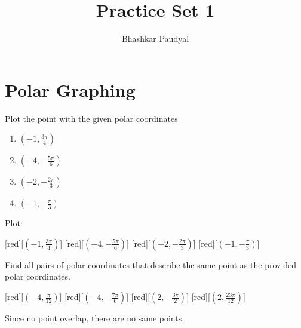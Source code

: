 \documentclass[a4paper, margin=0.5in]{article}
\author{Bhashkar Paudyal}
\title{Practice Set 1}
\begin{document}
\maketitle
\newpage

\tableofcontents{}
\newpage

\section{Polar Graphing}
\label{sec:polar-graphing}

\begin{problem}
  Plot the point with the given polar coordinates

  \begin{enumerate}
    \item \((-1,\frac{3\pi}{4})\) 
    \item \((-4, -\frac{5\pi}{6})\) 
    \item \((-2, -\frac{2\pi}{3})\) 
    \item \((-1, -\frac{\pi}{3})\) 
  \end{enumerate}

  \begin{solution}
    Plot:\\
    \begin{polargrid}[5][5][12][5.5]
      [red][\((-1,\frac{3\pi}{4})\)]
      [red][\((-4,-\frac{5\pi}{6})\)]
      [red][\((-2,-\frac{2\pi}{3})\)]
      [red][\((-1,-\frac{\pi}{3})\)]
    \end{polargrid}
  \end{solution}
\end{problem}

\newpage

\begin{problem}
  Find all pairs of polar coordinates that describe the same point as the
  provided polar coordinates.\\
  \begin{polargrid}[4][4][24][4.5]
    [red][\((-4,\frac{\pi}{12})\)]
    [red][\((-4,-\frac{7\pi}{6})\)]
    [red][\((2,-\frac{3\pi}{2})\)]
    [red][\((2,\frac{23\pi}{12})\)]
  \end{polargrid}

  \begin{solution}
    Since no point overlap, there are no same points.
  \end{solution}

\end{problem}
\end{document}
